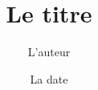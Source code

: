 \documentclass[10pt]{article}
\title{Le titre}
\author{L'auteur}
\date{La date}
\begin{document}

\pagebreak
\end{document}
